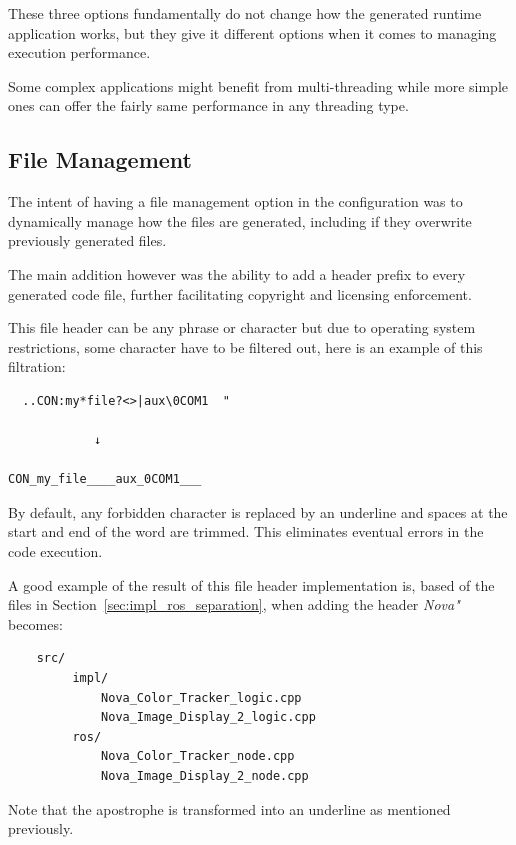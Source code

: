 These three options fundamentally do not change how the generated runtime application works, but they give it different options when it comes to managing execution performance.

\begin{tcolorbox}[colback=blue!5, colframe=blue!40!black] Some complex applications might benefit from multi-threading while more simple ones can offer the fairly same performance in any threading type.
\end{tcolorbox}


\subsection{File Management}
\label{sec:impl_file_mng}

The intent of having a file management option in the configuration was to dynamically manage how the files are generated, including if they overwrite previously generated files.

The main addition however was the ability to add a header prefix to every generated code file, further facilitating copyright and licensing enforcement.

This file header can be any phrase or character but due to operating system restrictions, some character have to be filtered out, here is an example of this filtration:

\begin{verbatim}
  ..CON:my*file?<>|aux\0COM1  "

			↓

CON_my_file____aux_0COM1___
\end{verbatim}

By default, any forbidden character is replaced by an underline and spaces at the start and end of the word are trimmed. This eliminates eventual errors in the code execution.

A good example of the result of this file header implementation is, based of the files in Section~\ref{sec:impl_ros_separation}, when adding the header \textit{Nova"} becomes:

\begin{verbatim}
	src/
		 impl/
			 Nova_Color_Tracker_logic.cpp
			 Nova_Image_Display_2_logic.cpp
		 ros/
			 Nova_Color_Tracker_node.cpp
			 Nova_Image_Display_2_node.cpp
\end{verbatim}

Note that the apostrophe is transformed into an underline as mentioned previously.

